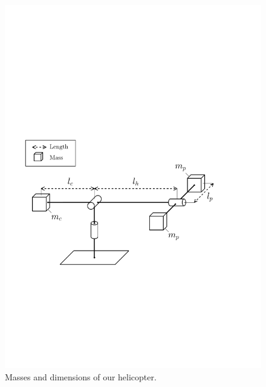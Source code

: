 \begin{figure}[tp]
	\centering
	\includegraphics[width=1.00\textwidth]{figures/masses.pdf}
	\caption{Masses and dimensions of our helicopter.}
\label{fig:masses}
\end{figure}

